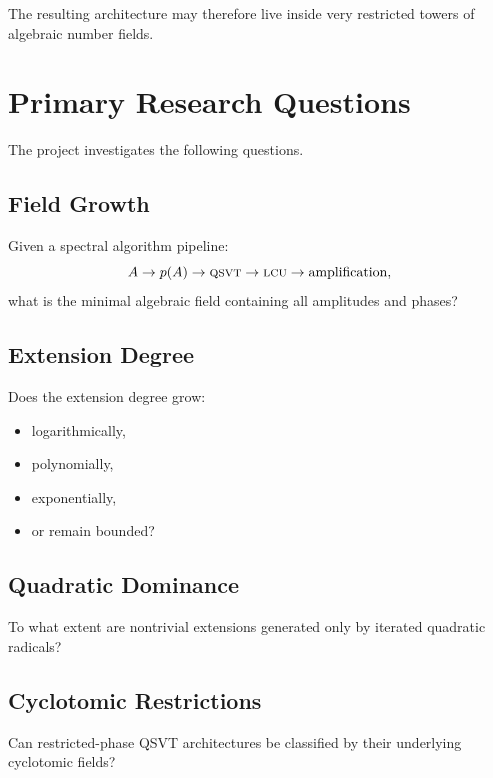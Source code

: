 \documentclass[12pt,a4paper]{article}
\newcommand{\QSVT}{\textsc{qsvt}}
\newcommand{\LCU}{\textsc{lcu}}
\begin{document}
The resulting architecture may therefore live inside very restricted towers of algebraic number fields.


\section{Primary Research Questions}

The project investigates the following questions.

\subsection{Field Growth}

Given a spectral algorithm pipeline:
\[
A
\rightarrow
p(A)
\rightarrow
\QSVT
\rightarrow
\LCU
\rightarrow
\text{amplification},
\]
what is the minimal algebraic field containing all amplitudes and phases?

\subsection{Extension Degree}

Does the extension degree grow:

\begin{itemize}
    \item logarithmically,
    \item polynomially,
    \item exponentially,
    \item or remain bounded?
\end{itemize}

\subsection{Quadratic Dominance}

To what extent are nontrivial extensions generated only by iterated quadratic radicals?

\subsection{Cyclotomic Restrictions}

Can restricted-phase QSVT architectures be classified by their underlying cyclotomic fields?

\end{document}
